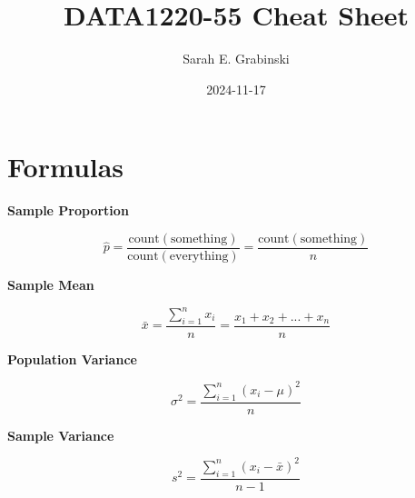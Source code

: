 \documentclass[
  letterpaper,
  DIV=11,
  numbers=noendperiod]{scrartcl}
\title{DATA1220-55 Cheat Sheet}
\author{Sarah E. Grabinski}
\date{2024-11-17}
\begin{document}
\maketitle


\section{Formulas}\label{formulas}

\begin{multicols}{2}

\begin{center}

\textbf{Sample Proportion}

$$
\hat{p} = \frac{\text{count}\left(\text{something}\right)}{\text{count}\left(\text{everything}\right)}=\frac{\text{count}\left(\text{something}\right)}{n}
$$

\end{center}

\columnbreak

\begin{center}

\textbf{Sample Mean}

$$
\bar{x}=\frac{\sum_{i=1}^n x_i}{n}=\frac{x_1+x_2+...+x_n}{n}
$$

\end{center}

\end{multicols}
\begin{multicols}{2}

\begin{center}

\textbf{Population Variance}

$$
\sigma^2=\frac{\sum_{i=1}^n (x_i-\mu)^2}{n}
$$

\end{center}

\columnbreak

\begin{center}

\textbf{Sample Variance}

$$
s^2=\frac{\sum_{i=1}^n (x_i-\bar{x})^2}{n-1}
$$

\end{center}

\end{multicols}
\end{document}
